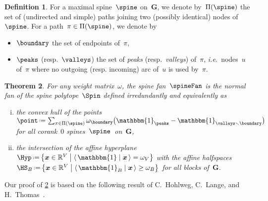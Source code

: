 \documentclass{amsart}
\newtheorem{theorem}{Theorem}[section]
\theoremstyle{definition}
\newtheorem{definition}[theorem]{Definition}
\newcommand{\R}{\mathbb{R}} %
\renewcommand{\b}[1]{{\boldsymbol{#1}}} %
\newcommand{\bigset}[2]{\big\{ #1 \;\big|\; #2 \big\}} %
\newcommand{\ssm}{\smallsetminus} %
\newcommand{\dotprod}[2]{\langle \, #1 \; | \; #2 \, \rangle} %
\newcommand{\one}{\mathbbm{1}} %
\newcommand{\eqdef}{\mbox{\,\raisebox{0.2ex}{\scriptsize\ensuremath{\mathrm:}}\ensuremath{=}\,}} %
\newcommand{\ie}{\textit{i.e.}~} %
\newcommand{\darkblue}{\color{darkblue}} %
\newcommand{\defn}[1]{\textsl{\darkblue #1}} %
\newcommand{\vertexSet}{V}
\newcommand{\weight}{\omega} %
\begin{document}
\begin{definition}
  For a maximal spine~$\spine$ on~$\b{G}$, we denote by~$\Pi(\spine)$ the set of (undirected and simple) paths joining two (possibly identical) nodes of~$\spine$.
  For a path~$\pi \in \Pi(\spine)$, we denote by
  \begin{itemize}
    \item $\boundary$ the set of endpoints of~$\pi$, %
    \item $\peaks$ (resp.~$\valleys$) the set of \defn{peaks} (resp.~\defn{valleys}) of~$\pi$, \ie nodes~$u$ of~$\pi$ where no outgoing (resp. incoming) arc of~$u$ is used by~$\pi$.
  \end{itemize}
\end{definition}

\begin{theorem}
  \label{thm:permutreehedra}
  For any weight matrix~$\weight$, the spine fan~$\spineFan$ is the normal fan of the \defn{spine polytope}~$\Spin$ defined irredundantly and equivalently as
  \begin{enumerate}[(i)]
    \item the convex hull of the points~$\point \eqdef \sum_{\pi \in \Pi(\spine)} \weight_{\boundary} \big( \one_{\peaks} - \one_{\valleys \ssm \boundary} \big)$ for all corank~$0$ spines~$\spine$~on~$\b{G}$,
    \item the intersection of the affine hyperplane~$\Hyp \eqdef \bigset{\b{x} \in \R^{\vertexSet}}{\dotprod{\one}{\b{x}} = \weight_{\vertexSet}}$ with the affine halfspaces~$\HS_B \eqdef \bigset{\b{x} \in \R^{\vertexSet}}{\dotprod{\one_B}{\b{x}} \ge \weight_B}$ for all blocks of~$\b{G}$.
  \end{enumerate}
\end{theorem}

Our proof of \cref{thm:permutreehedra} is based on the following result of C.~Hohlweg, C.~Lange, and H.~Thomas~\cite{HohlwegLangeThomas}.
\end{document}
